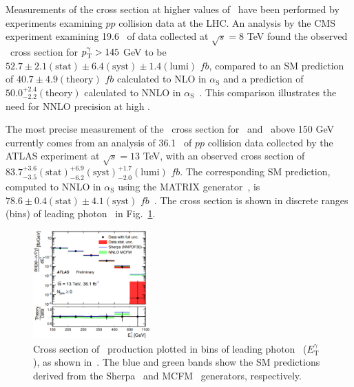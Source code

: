\documentclass[oneside, letterpaper, 12pt, oldfontcommands]{memoir}
\begin{document}
Measurements of the cross section at higher values of \pTgamma\ have been performed by experiments examining $pp$ collision data at the LHC.
An analysis by the CMS experiment examining 19.6 \fbinv\ of data collected at $\sqrt{s} = 8$ TeV found the observed \zinvg\ cross section for $p^{\gamma}_\mathrm{T} > 145$ GeV to be
$52.7 \pm 2.1\mathrm{(stat)} \pm 6.4\mathrm{(syst)} \pm 1.4\mathrm{(lumi)}$ $fb$, compared to an SM prediction of $40.7 \pm 4.9\mathrm{(theory)}$ $fb$ calculated to NLO in $\alpha_\mathrm{S}$ and
a prediction of $50.0^{+2.4}_{-2.2}\mathrm{(theory)}$ calculated to NNLO in $\alpha_\mathrm{S}$~\cite{ref:j.physletb.2016.06.080}. This comparison illustrates the need for NNLO precision at high \pTgamma.

The most precise measurement of the \zinvg\ cross section for \pTgamma\ and \MET\ above 150 GeV currently comes from an analysis of 36.1 \fbinv\ of $pp$ collision data
collected by the ATLAS experiment at $\sqrt{s} = 13$ TeV, with an observed cross section of $83.7^{+3.6}_{-3.5}\mathrm{(stat)}^{+6.9}_{-6.2}\mathrm{(syst)}^{+1.7}_{-2.0}\mathrm{(lumi)}$ $fb$.
The corresponding SM prediction, computed to NNLO in $\alpha_\mathrm{S}$ using the MATRIX generator~\cite{ref:epjc/s10052-018-5771-7}, is $78.6 \pm 0.4\mathrm{(stat)} \pm 4.1\mathrm{(syst)}$ $fb$~\cite{ref:CERN-EP-2018-220}.
The cross section is shown in discrete ranges (bins) of leading photon \pT\ in Fig.~\ref{fig:znng_xsec_phoET_ATLAS}.

\begin{figure}[hbtp]
  \begin{center}
    \includegraphics[width=0.4\textwidth]{Figures/znng_xsec_phoET_ATLAS.png}
    \caption{
      Cross section of \zinvg\ production plotted in bins of leading photon \pT\ ($E^{\gamma}_\mathrm{T}$), as shown in~\cite{ref:CERN-EP-2018-220}.
      The blue and green bands show the SM predictions derived from the Sherpa~\cite{ref:1126-6708/2009/02/007} and MCFM~\cite{ref:JHEP07(2011)018} generators, respectively.
    }
    \label{fig:znng_xsec_phoET_ATLAS}
  \end{center}
\end{figure}
\end{document}
